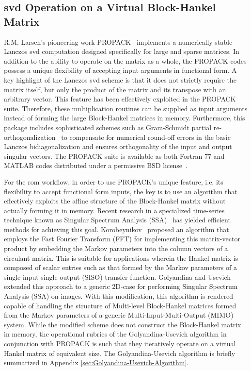 \subsection{\gls{svd} Operation on a Virtual Block-Hankel Matrix}

R.M. Larsen's pioneering work PROPACK~\cite{Larsen2014} implements
a numerically stable Lanczos \gls{svd} computation designed specifically
for large and sparse matrices. In addition to the ability to operate
on the matrix as a whole, the PROPACK codes possess a unique flexibility
of accepting input arguments in functional form. A key highlight of
the Lanczos \gls{svd} scheme is that it does not strictly require the matrix
itself, but only the product of the matrix and its transpose with
an arbitrary vector. This feature has been effectively exploited in
the PROPACK suite. Therefore, these multiplication routines can be
supplied as input arguments instead of forming the large Block-Hankel
matrices in memory. Furthermore, this package includes sophisticated
schemes such as Gram-Schmidt partial re-orthogonalization~\cite{Bjoerck1994}
to compensate for numerical round-off errors in the basic Lanczos
bidiagonalization and ensures orthogonality of the input and output
singular vectors. The PROPACK suite is available as both Fortran 77
and MATLAB codes distributed under a permissive BSD license~\cite{Rosen2005}.

For the \gls{rom} workflow, in order to use PROPACK's unique feature, i.e.
its flexibility to accept functional form inputs, the key is to use
an algorithm that effectively exploits the affine structure of the
Block-Hankel matrix without actually forming it in memory. Recent
research in a specialized time-series technique known as Singular
Spectrum Analysis (SSA)~\cite{ElsnerTsonis2013} has yielded efficient
methods for achieving this goal. Korobeynikov~\cite{Korobeynikov2009}
proposed an algorithm that employs the Fast Fourier Transform (FFT)
for implementing this matrix-vector product by embedding the Markov
parameters into the column vectors of a circulant matrix. This is
suitable for applications wherein the Hankel matrix is composed of
scalar entries such as that formed by the Markov parameters of a single
input single output (SISO) transfer function. Golyandina and Usevich~\cite{GolyandinaKorobeynikovShlemovEtAl2015,GolyandinaUsevich2004}
extended this approach to a generic 2D-case for performing Singular
Spectrum Analysis (SSA) on images. With this modification, this algorithm
is rendered capable of handling the structure of Multi-level Block-Hankel
matrices formed from the Markov parameters of a generic Multi-Input-Multi-Output
(MIMO) system. While the modified scheme does not construct the Block-Hankel
matrix in memory, the operational rubrics of the Golyandina-Usevich
algorithm in conjunction with PROPACK is such that they iteratively
operate on a virtual Hankel matrix of equivalent size. The Golyandina-Usevich
algorithm is briefly summarized in Appendix \ref{sec:Golyandina-Usevich-Algorithm}.

